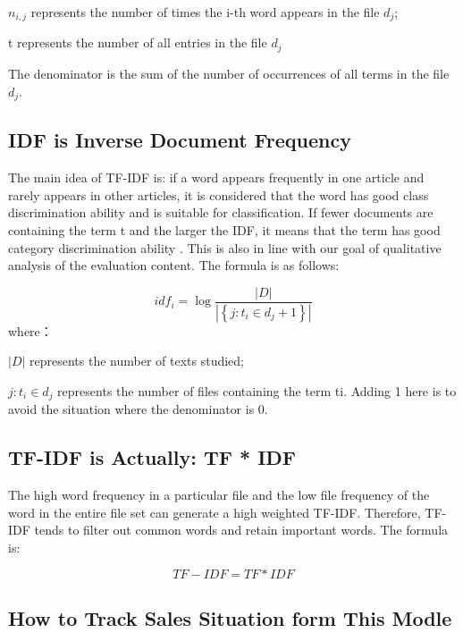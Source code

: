 \documentclass[UTF8]{article}
\newcommand{\upcite}[1]{\textsuperscript{\textsuperscript{\cite{#1}}}}
\begin{document}
$n_ {i, j}$ represents the number of times the i-th word appears in the file $d_j$;

t represents the number of all entries in the file $d_j$

The denominator is the sum of the number of occurrences of all terms in the file $d_j$.

\subsection{IDF is Inverse Document Frequency}

 The main idea of TF-IDF is: if a word appears frequently in one article and rarely appears in other articles, it is considered that the word has good class discrimination ability and is suitable for classification. If fewer documents are containing the term t and the larger the IDF, it means that the term has good category discrimination ability \upcite{Baenagarc2012TF}. This is also in line with our goal of qualitative analysis of the evaluation content. The formula is as follows:

 \begin{equation}
 i d f_{i}=\log \frac{|D|}{\left|\left\{j: t_{i} \in d_{j}+1\right\}\right|}
 \end{equation}
 where：

 $|D|$ represents the number of texts studied;

 $j: t_{i} \in d_ {j}$ represents the number of files containing the term ti. Adding 1 here is to avoid the situation where the denominator is 0.

\subsection{TF-IDF is Actually: TF * IDF}

The high word frequency in a particular file and the low file frequency of the word in the entire file set can generate a high weighted TF-IDF. Therefore, TF-IDF tends to filter out common words and retain important words. The formula is:

\begin{equation}
TF-I D F=T F * I D F
\end{equation}

\subsection{How to Track Sales Situation form This Modle}
\end{document}
